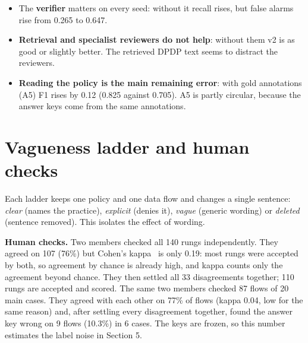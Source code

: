 \documentclass[11pt,a4paper]{article}
\begin{document}
\begin{itemize}
  \item The \textbf{verifier} matters on every seed: without it recall rises, but false alarms
        rise from 0.265 to 0.647.
  \item \textbf{Retrieval and specialist reviewers do not help}: without them v2 is as good or
        slightly better. The retrieved DPDP text seems to distract the reviewers.
  \item \textbf{Reading the policy is the main remaining error}: with gold annotations (A5) F1 rises
        by 0.12 (0.825 against 0.705). A5 is partly circular, because the answer keys come from the
        same annotations.
\end{itemize}

\section{Vagueness ladder and human checks}

Each ladder keeps one policy and one data flow and changes a single sentence: \emph{clear} (names
the practice), \emph{explicit} (denies it), \emph{vague} (generic wording) or \emph{deleted}
(sentence removed). This isolates the effect of wording.

\textbf{Human checks.} Two members checked all 140 rungs independently. They agreed on 107 (76\%)
but Cohen's kappa~\cite{kappa} is only 0.19: most rungs were accepted by both, so agreement by
chance is already high, and kappa counts only the agreement beyond chance. They then settled all 33
disagreements together; 110 rungs are accepted and scored. The same two members checked 87 flows of
20 main cases. They agreed with each other on 77\% of flows (kappa 0.04, low for the same reason)
and, after settling every disagreement together, found the answer key wrong on 9 flows (10.3\%) in
6 cases. The keys are frozen, so this number estimates the label noise in Section 5.
\end{document}
